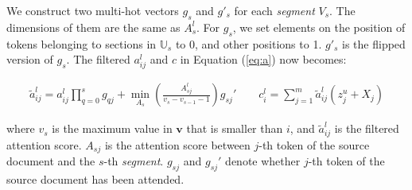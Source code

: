 We construct two multi-hot vectors $g_{s}$ and $g'_{s}$ for each \textit{segment} $V_{s}$.
The dimensions of them are the
same as $A_{s}^{l}$. For $g_{s}$, we set elements on the position of tokens
belonging to sections in $\mathbb{U}_{s}$ to 0, and other
positions to 1. $g'_{s}$ is the flipped version of $g_{s}$. 
The filtered $a_{ij}^{l}$ and $c$ in Equation (\ref{eq:a}) now becomes:
\begin{small}
\begin{align}
	\tilde{a}_{ij}^{l} = a_{ij}^{l}\prod_{q=0}^{s}g_{qj} + \min \limits_{A_{s}}\left(\frac{A_{sj}^{l}}{v_{s}-v_{s-1}-1}\right)g_{sj}' \quad \quad
    c _ { i } ^ { l } = \sum _ { j = 1 } ^ { m } \tilde{a}_{ij}^{l} \left( z _ { j } ^ { u } + X_j \right)
\end{align}
\end{small}
where $v_{s}$ is the maximum value in 
$\mathbf{v}$ that is smaller than $i$, and $\tilde{a}_{ij}^l$ is the filtered
attention score. $A_{sj}$ is the attention score between $j$-th token
of the source document and the $s$-th \textit{segment}. 
$g_{sj}$ and $g_{sj}'$ denote whether $j$-th token
of the source document has been attended.



